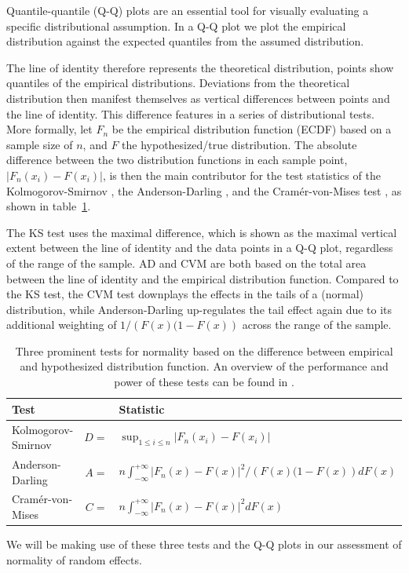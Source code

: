 \documentclass[12pt]{article} %
\newcommand{\hh}[1]{{\color{orange} #1}}
\begin{document}
Quantile-quantile (Q-Q) plots \citep{Wilk:1968} are an essential tool for  visually evaluating a specific distributional assumption. In a Q-Q plot we plot the empirical distribution against the expected quantiles from the assumed distribution. \hh{The line of identity therefore represents the theoretical distribution, points show quantiles of the empirical distributions. Deviations from the theoretical distribution then manifest themselves as vertical differences between points and the line of identity. This difference features in a series of distributional tests. More formally, let $F_n$ be the empirical distribution function (ECDF) based on a sample size of $n$, and $F$ the hypothesized/true distribution. The absolute difference between the two distribution functions in each sample point, $\left| F_n(x_i) - F(x_i) \right|$, is then the main contributor for the test statistics of the Kolmogorov-Smirnov \cite[KS-test,][]{kolmogorov:1933, smirnov:1948}, the Anderson-Darling \citep[AD-test,][]{adtest:1954}, and the Cram\'{e}r-von-Mises test \citep[CVM-test,][]{cramer:1928, mises:1928}, as shown in table~\ref{tab:tests}.

The KS test uses the maximal  difference, which is shown as the maximal vertical extent between the line of identity and the data points in a Q-Q plot, regardless of the range of the sample.  AD and CVM  are both based on the total area between the line of identity and the empirical distribution function. Compared to the KS  test,  the CVM test downplays the effects in the tails of a (normal) distribution, while Anderson-Darling up-regulates the tail effect again due to its additional weighting of $1/\left(F(x)(1 - F(x)\right)$ across the range of the sample. 
\begin{table}
\begin{tabular}{lrl}\hline
Test && Statistic\\\hline\hline
Kolmogorov-Smirnov & $D =$ & $ \sup_{1 \le i \le n} \left | F_n(x_i) - F(x_i)\right|$ \\
Anderson-Darling & $A =$ & $ n \int_{-\infty}^{+\infty} \left | F_n(x) - F(x)\right|^2/\left(F(x)(1 - F(x)\right) dF(x)$\\
Cram\'{e}r-von-Mises & $C =$ & $n \int_{-\infty}^{+\infty} \left | F_n(x) - F(x)\right|^2 dF(x)$ \\\hline
\end{tabular}
\caption{\label{tab:tests} Three prominent tests for normality based on the difference between empirical and hypothesized distribution function. An overview of the performance and power of these tests can be found in \citet{stephens:1974}.}
\end{table}
%
We will be making use of these three tests and the Q-Q plots in our assessment of normality of random effects.
}
\end{document}
